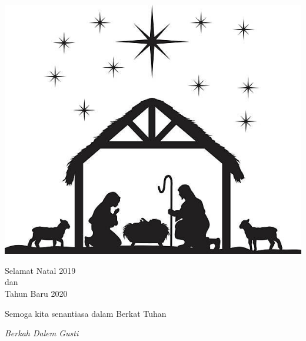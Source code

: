 \documentclass[a5paper,12pt,openany]{scrbook}
\begin{document}
\newpage
\thispagestyle{empty}
\begin{center}
	
	\includegraphics[scale=2]{manger.jpg}
	
	\Large
	
\vspace{2cm}
	
	Selamat Natal 2019\\dan\\Tahun Baru 2020
	
	\vspace{1cm}
	
	Semoga kita senantiasa dalam Berkat Tuhan
	
	\vspace{1cm}

	\textit{Berkah Dalem Gusti}
	
\end{center}
\end{document}
